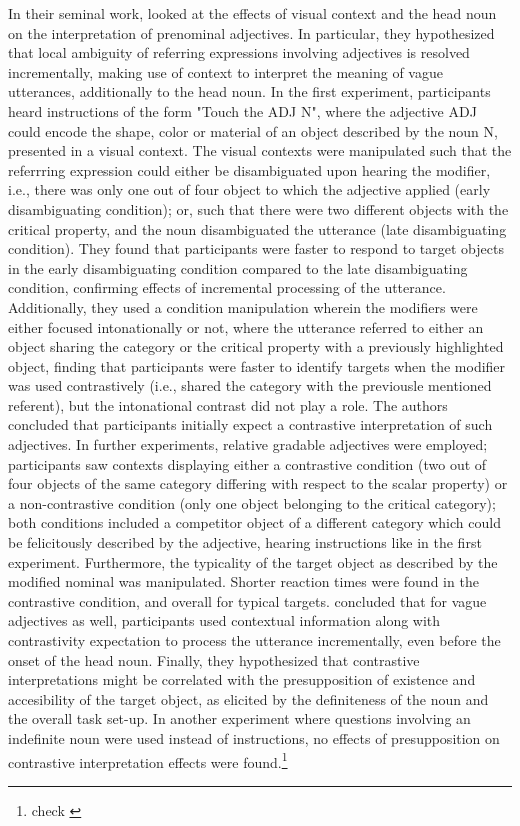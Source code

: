 In their seminal work, \textcite{sedivy1999} looked at the effects of visual context and the head noun on the interpretation of prenominal adjectives. In particular, they hypothesized that local ambiguity of referring expressions involving adjectives is resolved incrementally, making use of context to interpret the meaning of vague utterances, additionally to the head noun. 
In the first experiment, participants heard instructions of the form "Touch the ADJ N", where the adjective ADJ could encode the shape, color or material of an object described by the noun N, presented in a visual context. The visual contexts were manipulated such that the referrring expression could either be disambiguated upon hearing the modifier, i.e., there was only one out of four object to which the adjective applied (early disambiguating condition); or, such that there were two different objects with the critical property, and the noun disambiguated the utterance (late disambiguating condition). 
They found that participants were faster to respond to target objects in the early disambiguating condition compared to the late disambiguating condition, confirming effects of incremental processing of the utterance. 
 Additionally, they used a condition manipulation wherein the modifiers were either focused intonationally or not, where the utterance referred to either an object sharing the category or the critical property with a previously highlighted object, finding that participants were faster to identify targets when the modifier was used contrastively (i.e., shared the category with the previousle mentioned referent), but the intonational contrast  did not play a role. The authors concluded that participants initially expect a contrastive interpretation of such adjectives. 
 In further experiments, relative gradable adjectives were employed; participants saw contexts displaying either a contrastive condition (two out of four objects of the same category differing with respect to the scalar property) or a non-contrastive condition (only one object belonging to the critical category); both conditions included a competitor object of a different category which could be felicitously described by the adjective, hearing instructions like in the first experiment. Furthermore, the typicality of the target object as described by the modified nominal was manipulated. Shorter reaction times were found in the contrastive condition, and overall for typical targets. \textcite{sedivy1999} concluded that for vague adjectives as well, participants used contextual information along with contrastivity expectation to process the utterance incrementally, even before the onset of the head noun. Finally, they hypothesized that contrastive interpretations might be correlated with the presupposition of existence and accesibility of the target object, as elicited by the definiteness of the noun and the overall task set-up. In another experiment where questions involving an indefinite noun were used instead of instructions,  no effects of presupposition on contrastive interpretation effects were found.\footnote{check \parencite{Reboul2001}} 

